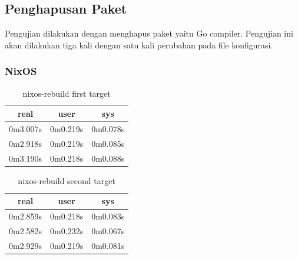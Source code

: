 \documentclass[10pt,]{report}
\begin{document}
\begin{adjustwidth}{20pt}{}
	\subsection{Penghapusan Paket}
	\begin{adjustwidth}{20pt}{}
		Pengujian dilakukan dengan menghapus paket yaitu Go compiler.
		Pengujian ini akan dilakukan tiga kali dengan satu kali perubahan pada file
		konfigurasi.
	\end{adjustwidth}
	\subsubsection{NixOS}
	\begin{table}[H]
		\caption{nixos-rebuild first target}
		\begin{center}
			\begin{tabular}[c]{|c|c|c|}
				\hline
				\multicolumn{1}{|c|}{\textbf{real}} &
				\multicolumn{1}{c|}{\textbf{user}}  &
				\multicolumn{1}{c|}{\textbf{sys}}                         \\
				\hline
				0m3.007s                            & 0m0.219s & 0m0.078s \\
				\hline
				0m2.918s                            & 0m0.219s & 0m0.085s \\
				\hline
				0m3.190s                            & 0m0.218s & 0m0.088s \\
				\hline
			\end{tabular}
		\end{center}
	\end{table}
	\vspace{-5mm}
	\begin{table}[H]
		\caption{nixos-rebuild second target}
		\begin{center}
			\begin{tabular}[c]{|c|c|c|}
				\hline
				\multicolumn{1}{|c|}{\textbf{real}} &
				\multicolumn{1}{c|}{\textbf{user}}  &
				\multicolumn{1}{c|}{\textbf{sys}}                         \\
				\hline
				0m2.859s                            & 0m0.218s & 0m0.083s \\
				\hline
				0m2.582s                            & 0m0.232s & 0m0.067s \\
				\hline
				0m2.929s                            & 0m0.219s & 0m0.081s \\
				\hline
			\end{tabular}
		\end{center}
	\end{table}

\end{adjustwidth}
\end{document}
